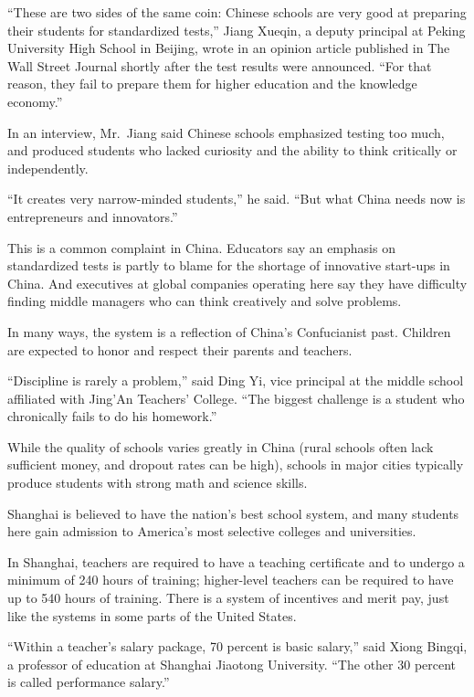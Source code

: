 ﻿\documentclass[12pt]{article}
\begin{document}
``These are two sides of the same coin: Chinese schools are very good at preparing their students
for standardized tests,'' Jiang Xueqin, a deputy principal at Peking University High School in
Beijing, wrote in an opinion article published in The Wall Street Journal shortly after the test
results were announced. ``For that reason, they fail to prepare them for higher education and the
knowledge economy.''

In an interview, Mr.~Jiang said Chinese schools emphasized testing too much, and produced students
who lacked curiosity and the ability to think critically or independently.

``It creates very narrow-minded students,'' he said. ``But what China needs now is entrepreneurs and
innovators.''

This is a common complaint in China. Educators say an emphasis on standardized tests is partly to
blame for the shortage of innovative start-ups in China. And executives at global companies
operating here say they have difficulty finding middle managers who can think creatively and solve
problems.

In many ways, the system is a reflection of China's Confucianist past. Children are expected to
honor and respect their parents and teachers.

``Discipline is rarely a problem,'' said Ding Yi, vice principal at the middle school affiliated
with Jing'An Teachers' College. ``The biggest challenge is a student who chronically fails to do his
homework.''

While the quality of schools varies greatly in China (rural schools often lack sufficient money, and
dropout rates can be high), schools in major cities typically produce students with strong math and
science skills.

Shanghai is believed to have the nation's best school system, and many students here gain admission
to America's most selective colleges and universities.

In Shanghai, teachers are required to have a teaching certificate and to undergo a minimum of 240
hours of training; higher-level teachers can be required to have up to 540 hours of training. There
is a system of incentives and merit pay, just like the systems in some parts of the United States.

``Within a teacher's salary package, 70 percent is basic salary,'' said Xiong Bingqi, a professor of
education at Shanghai Jiaotong University. ``The other 30 percent is called performance salary.''
\end{document}
